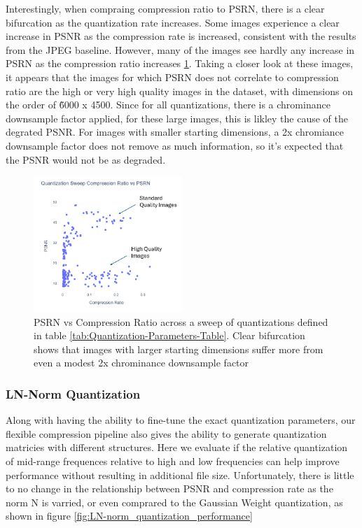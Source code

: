 Interestingly, when compraing compression ratio to PSRN, there is a clear bifurcation as the quantization rate increases. Some images experience a clear increase in PSNR as the compression rate is increased, consistent with the results from the JPEG baseline. However, many of the images see hardly any increase in PSRN as the compression ratio increases \ref{fig:gauss_quantization_vs_psnr}. Taking a closer look at these images, it appears that the images for which PSRN does not correlate to compression ratio are the high or very high quality images in the dataset, with dimensions on the order of \~ 6000 x 4500. Since for all quantizations, there is a chrominance downsample factor applied, for these large images, this is likley the cause of the degrated PSNR. For images with smaller starting dimensions, a 2x chromiance downsample factor does not remove as much information, so it's expected that the PSNR would not be as degraded.

\begin{figure}
    \includegraphics[width=0.5\textwidth]{assets/Quantization Sweep Compression Ratio vs PSRN.png}
    \caption{PSRN vs Compression Ratio across a sweep of quantizations defined in table \ref{tab:Quantization-Parameters-Table}. Clear bifurcation shows that images with larger starting dimensions suffer more from even a modest 2x chrominance downsample factor}
    \label{fig:gauss_quantization_vs_psnr}
\end{figure}

\subsubsection{LN-Norm Quantization}

Along with having the ability to fine-tune the exact quantization parameters, our flexible compression pipeline also gives the ability to generate quantization matricies with different structures. Here we evaluate if the relative quantization of mid-range frequences relative to high and low frequencies can help improve performance without resulting in additional file size. Unfortunately, there is little to no change in the relationship between PSNR and compression rate as the norm N is varried, or even comprared to the Gaussian Weight quantization, as shown in figure \ref{fig:LN-norm_quantization_performance}

